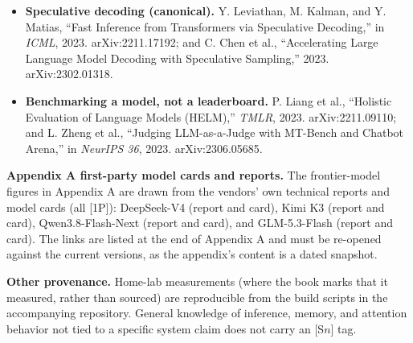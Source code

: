 \begin{itemize}
\item \textbf{Speculative decoding (canonical).} Y. Leviathan, M. Kalman, and Y. Matias, ``Fast Inference from Transformers via Speculative Decoding,'' in \emph{ICML}, 2023. arXiv:2211.17192; and C. Chen et al., ``Accelerating Large Language Model Decoding with Speculative Sampling,'' 2023. arXiv:2302.01318.
\item \textbf{Benchmarking a model, not a leaderboard.} P. Liang et al., ``Holistic Evaluation of Language Models (HELM),'' \emph{TMLR}, 2023. arXiv:2211.09110; and L. Zheng et al., ``Judging LLM-as-a-Judge with MT-Bench and Chatbot Arena,'' in \emph{NeurIPS 36}, 2023. arXiv:2306.05685.
\end{itemize}

\noindent\textbf{Appendix A first-party model cards and reports.} The frontier-model figures in Appendix A are drawn from the vendors' own technical reports and model cards (all \textsc{[1P]}): DeepSeek-V4 (report and card), Kimi K3 (report and card), Qwen3.8-Flash-Next (report and card), and GLM-5.3-Flash (report and card). The links are listed at the end of Appendix A and must be re-opened against the current versions, as the appendix's content is a dated snapshot.

\noindent\textbf{Other provenance.} Home-lab measurements (where the book marks that it measured, rather than sourced) are reproducible from the build scripts in the accompanying repository. General knowledge of inference, memory, and attention behavior not tied to a specific system claim does not carry an \textsc{[S$n$]} tag.
